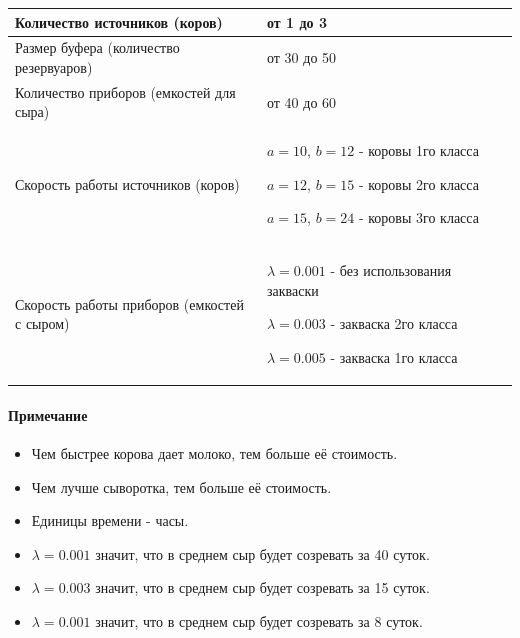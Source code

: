 \documentclass[a4paper, 14pt]{article}
\begin{document}
\begin{center}
	\begin{tabular}{|p{0.5\linewidth} | p{0.5\linewidth}|}
		\hline
		Количество источников (коров)           & от 1 до 3                                                                                                                           \\
		\hline
		Размер буфера (количество резервуаров)  & от 30 до 50                                                                                                                         \\
		\hline
		Количество приборов (емкостей для сыра) & от 40 до 60                                                                                                                        \\
		\hline
		Скорость работы источников (коров)      & $a = 10$, $b = 12$ - коровы 1го класса \par $a = 12$, $b = 15$ - коровы 2го класса \par $a = 15$, $b = 24$ - коровы 3го класса                 \\
		\hline
		Скорость работы приборов (емкостей с сыром)   & $\lambda = 0.001$ - без использования закваски \par $\lambda = 0.003$ - закваска 2го класса \par $\lambda = 0.005$ - закваска 1го класса \\
		\hline
	\end{tabular}
\end{center}

\paragraph{Примечание}

\begin{itemize}
	\item Чем быстрее корова дает молоко, тем больше её стоимость.
	\item Чем лучше сыворотка, тем больше её стоимость.
	\item Единицы времени - часы.
	\item $\lambda = 0.001$ значит, что в среднем сыр будет созревать за 40 суток.
	\item $\lambda = 0.003$ значит, что в среднем сыр будет созревать за 15 суток.
	\item $\lambda = 0.001$ значит, что в среднем сыр будет созревать за 8 суток.
\end{itemize}
\end{document}
